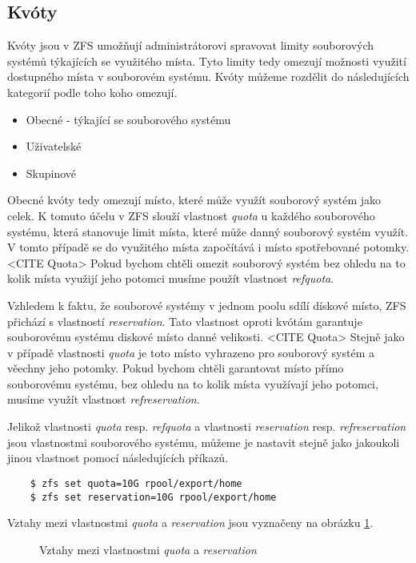     \subsection{Kvóty}
    \label{quota}
    Kvóty jsou v ZFS umožňují administrátorovi spravovat limity souborových systémů týkajících se využitého místa. Tyto limity tedy omezují možnosti využití dostupného místa v souborovém systému. Kvóty můžeme rozdělit do následujících kategorií podle toho koho omezují.
    \begin{itemize}
      \item Obecné - týkající se souborového systému
      \item Uživatelské
      \item Skupinové
    \end{itemize}
    
    Obecné kvóty tedy omezují místo, které může využít souborový systém jako celek. K tomuto účelu v ZFS slouží vlastnost \emph{quota} u každého souborového systému, která stanovuje limit místa, které může danný souborový systém využít. V tomto případě se do využitého místa započítává i místo spotřebované potomky. <CITE Quota> Pokud bychom chtěli omezit souborový systém bez ohledu na to kolik místa využijí jeho potomci musíme použít vlastnost \emph{refquota}.
     
    Vzhledem k faktu, že souborové systémy v jednom poolu sdílí dískové místo, ZFS přichází s vlastností \emph{reservation}. Tato vlastnost oproti kvótám garantuje souborovému systému diskové místo danné velikosti. <CITE Quota> Stejně jako v případě vlastnosti \emph{quota} je toto místo vyhrazeno pro souborový systém a věechny jeho potomky. Pokud bychom chtěli garantovat místo přímo souborovému systému, bez ohledu na to kolik místa využívají jeho potomci, musíme využít vlastnost \emph{refreservation}. 
    
    Jelikož vlastnosti \emph{quota} resp. \emph{refquota} a vlastnosti \emph{reservation} resp. \emph{refreservation} jsou vlastnostmi souborového systému, můžeme je nastavit stejně jako jakoukoli jinou vlastnost pomocí následujících příkazů.
    \begin{verbatim}
    $ zfs set quota=10G rpool/export/home
    $ zfs set reservation=10G rpool/export/home
    \end{verbatim}   
        
    Vztahy mezi vlastnostmi \emph{quota} a \emph{reservation} jsou vyznačeny na obrázku \ref{quotavsreserv}.
    \begin{figure}[h]
        \caption{Vztahy mezi vlastnostmi \emph{quota} a \emph{reservation}}
        \label{quotavsreserv}        
    \end{figure}
    
